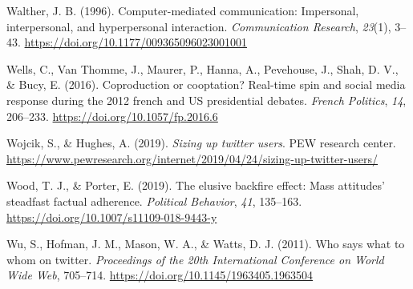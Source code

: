 \documentclass[
  12pt,
]{article}
\newlength{\cslhangindent}
\newlength{\cslentryspacingunit} %
\newenvironment{CSLReferences}[2] %
 {%
  \setlength{\parindent}{0pt}
  \ifodd #1
  \let\oldpar\par
  \def\par{\hangindent=\cslhangindent\oldpar}
  \fi
  \setlength{\parskip}{#2\cslentryspacingunit}
 }%
 {}
\begin{document}
\begin{CSLReferences}{1}{0}
\leavevmode{}%
Walther, J. B. (1996). Computer-mediated communication: Impersonal,
interpersonal, and hyperpersonal interaction. \emph{Communication
Research}, \emph{23}(1), 3--43.
\url{https://doi.org/10.1177/009365096023001001}

\leavevmode{}%
Wells, C., Van Thomme, J., Maurer, P., Hanna, A., Pevehouse, J., Shah,
D. V., \& Bucy, E. (2016). Coproduction or cooptation? Real-time spin
and social media response during the 2012 french and US presidential
debates. \emph{French Politics}, \emph{14}, 206--233.
\url{https://doi.org/10.1057/fp.2016.6}

\leavevmode{}%
Wojcik, S., \& Hughes, A. (2019). \emph{Sizing up twitter users}. PEW
research center.
\url{https://www.pewresearch.org/internet/2019/04/24/sizing-up-twitter-users/}

\leavevmode{}%
Wood, T. J., \& Porter, E. (2019). The elusive backfire effect: Mass
attitudes' steadfast factual adherence. \emph{Political Behavior},
\emph{41}, 135--163. \url{https://doi.org/10.1007/s11109-018-9443-y}

\leavevmode{}%
Wu, S., Hofman, J. M., Mason, W. A., \& Watts, D. J. (2011). Who says
what to whom on twitter. \emph{Proceedings of the 20th International
Conference on World Wide Web}, 705--714.
\url{https://doi.org/10.1145/1963405.1963504}

\end{CSLReferences}

\newpage
\end{document}
